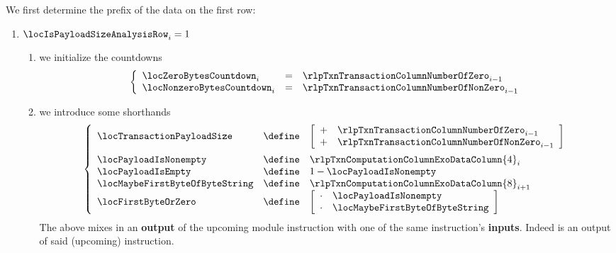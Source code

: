 We first determine the \rlp{} prefix of the data on the first row:
\begin{enumerate}[resume]
	\item \If $\locIsPayloadSizeAnalysisRow _{i} = 1$ \Then
		\begin{enumerate}
			\item we initialize the countdowns
				\[
					\left\{ \begin{array}{lcl}
						\locZeroBytesCountdown    _{i} & = & \rlpTxnTransactionColumnNumberOfZero    _{i - 1} \\
						\locNonzeroBytesCountdown _{i} & = & \rlpTxnTransactionColumnNumberOfNonZero _{i - 1} \\
					\end{array} \right.
				\]
			\item we introduce some shorthands
				\[
					\left\{ \begin{array}{lcl}
						\locTransactionPayloadSize & \define &
						\left[ \begin{array}{cl}
							+ & \rlpTxnTransactionColumnNumberOfZero    _{i - 1} \\
							+ & \rlpTxnTransactionColumnNumberOfNonZero _{i - 1} \\
						\end{array} \right]
						\vspace{2mm}
						\\
						\locPayloadIsNonempty          & \define & \rlpTxnComputationColumnExoDataColumn{4} _{i}      \\
						\locPayloadIsEmpty             & \define & 1 - \locPayloadIsNonempty   \\
						\locMaybeFirstByteOfByteString & \define & \rlpTxnComputationColumnExoDataColumn{8} _{i  + 1} \\
						\locFirstByteOrZero            & \define &
						\left[ \begin{array}{cl}
							\cdot & \locPayloadIsNonempty          \\
							\cdot & \locMaybeFirstByteOfByteString \\
						\end{array} \right]
					\end{array} \right.
				\]
				\saNote{}
				The above mixes in an \textbf{output} of the upcoming \rlpUtilsMod{} module instruction
				with one of the same instruction's \textbf{inputs}.
				Indeed \locPayloadIsNonempty{} is an output of said (upcoming) instruction.

\end{enumerate}
\end{enumerate}
